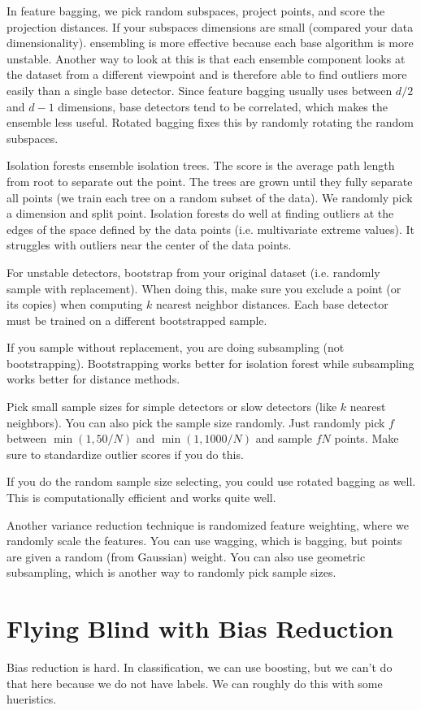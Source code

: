 \documentclass[a4paper]{article}
\begin{document}
In feature bagging, we pick random subspaces, project points, and score the
projection distances. If your subspaces dimensions are small (compared your
data dimensionality). ensembling is more effective because each base
algorithm is more unstable. Another way to look at this is that each
ensemble component looks at the dataset from a different viewpoint and is
therefore able to find outliers more easily than a single base detector.
Since feature bagging usually uses between $d/2$ and $d - 1$ dimensions,
base detectors tend to be correlated, which makes the ensemble less useful.
Rotated bagging fixes this by randomly rotating the random subspaces.

Isolation forests ensemble isolation trees. The score is the average
path length from root to separate out the point. The trees are grown
until they fully separate all points (we train each tree on a random
subset of the data). We randomly pick a dimension and split point. Isolation
forests do well at finding outliers at the edges of the space defined by
the data points (i.e. multivariate extreme values). It struggles with
outliers near the center of the data points.

For unstable detectors, bootstrap from your original dataset (i.e. randomly
sample with replacement). When doing this, make sure you exclude a point
(or its copies) when computing $k$ nearest neighbor distances. Each base
detector must be trained on a different bootstrapped sample.

If you sample without replacement, you are doing subsampling (not
bootstrapping). Bootstrapping works better for isolation forest while
subsampling works better for distance methods.

Pick small sample sizes for simple detectors or slow detectors (like
$k$ nearest neighbors). You can also pick the sample size randomly.
Just randomly pick $f$ between $\min(1, 50/N)$ and $\min(1, 1000/N)$
and sample $fN$ points. Make sure to standardize outlier scores if you
do this.

If you do the random sample size selecting, you could use rotated bagging
as well. This is computationally efficient and works quite well.

Another variance reduction technique is randomized feature weighting, where
we randomly scale the features. You can use wagging, which is bagging,
but points are given a random (from Gaussian) weight. You can also use
geometric subsampling, which is another way to randomly pick sample sizes.

\section{Flying Blind with Bias Reduction}
Bias reduction is hard. In classification, we can use boosting, but we
can't do that here because we do not have labels. We can roughly do this
with some hueristics.
\end{document}
